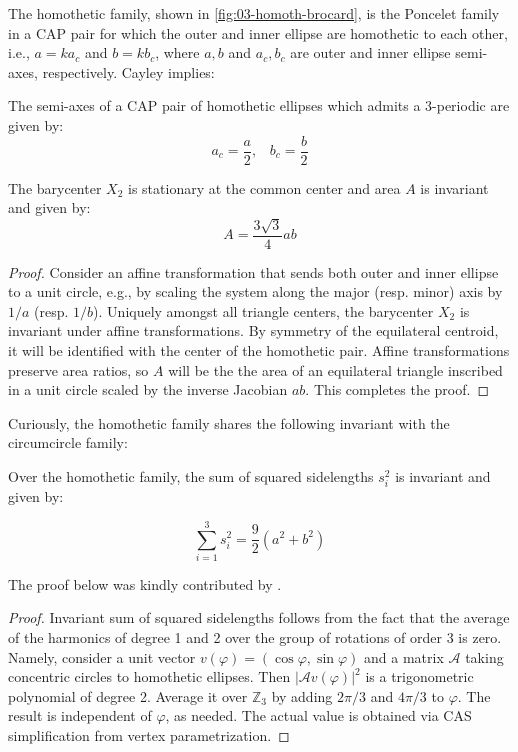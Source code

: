 The homothetic family, shown in \cref{fig:03-homoth-brocard}, is the Poncelet family in a CAP pair for which the outer and inner ellipse are homothetic to each other, i.e., $a = k a_c$ and $b = k b_c$, where $a,b$ and $a_c,b_c$ are outer and inner ellipse semi-axes, respectively. Cayley implies:

\begin{proposition}
The semi-axes of a CAP pair of homothetic ellipses which admits a 3-periodic are given by:
\[ a_c = \frac{a}{2},\;\;\;b_c=\frac{b}{2} \]
\label{prop:03-homothetic-cayley}
\end{proposition}

\begin{proposition}
The barycenter $X_2$ is stationary at the common center and area $A$ is invariant and given by:
\[A= \frac{3\sqrt{3}}{4} a b \]
\end{proposition}

\begin{proof}
Consider an affine transformation that sends both outer and inner ellipse to a unit circle, e.g., by scaling the system along the major (resp. minor) axis by $1/a$ (resp. $1/b$). Uniquely amongst all triangle centers, the barycenter $X_2$ is invariant under affine transformations. By symmetry of the equilateral centroid, it will be identified with the center of the homothetic pair. Affine transformations preserve area ratios, so $A$ will be the the area of an equilateral triangle inscribed in a unit circle scaled by the inverse Jacobian $a b$. This completes the proof.
\end{proof}

Curiously, the homothetic family shares the following invariant with the circumcircle family:

\begin{proposition}
Over the homothetic family, the sum of squared sidelengths $s_i^2$ is invariant and given by:
	
\[ \sum_{i=1}^3 s_i^2=\frac{9}{2} \left(a^{2}+b^{2}\right) \]
\end{proposition}

The proof below was kindly contributed by  \cite{sergei2020-private-sidelengths}.

\begin{proof}
Invariant sum of squared sidelengths follows from the fact that the average of the harmonics of degree 1 and 2 over the group of rotations of order 3 is zero. Namely, consider a unit vector $v(\varphi)=(\cos \varphi, \sin \varphi)$ and a matrix $\mathcal{A}$ taking concentric circles to homothetic ellipses. Then $|\mathcal{A}v(\varphi)|^2$ is a trigonometric polynomial of degree 2. Average it over $\mathbb{Z}_3$ by adding $2\pi/3$ and $4\pi/3$ to $\varphi$. The result is independent of $\varphi$, as needed. The actual value is obtained via CAS simplification from vertex parametrization.
\end{proof}

